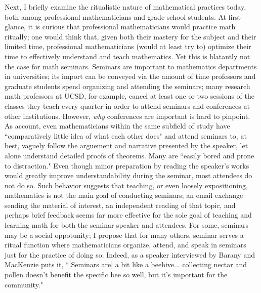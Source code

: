 \documentclass[12pt, letterpaper]{article}
\begin{document}
\vspace{1.5em} 
Next, I briefly examine the ritualistic nature of mathematical practices today, both among professional mathematicians and grade school students. 
At first glance, it is curious that professional mathematicians would practice math ritually; 
one would think that, given both their mastery for the subject and their limited time, professional mathematicians (would at least try to) optimize their time to effectively understand and teach mathematics. 
Yet this is blatantly not the case for math seminars. 
Seminars are important to mathematics departments in universities; 
its import can be conveyed via the amount of time professors and graduate students spend organizing and attending the seminars;
many research math professors at UCSD, for example, cancel at least one or two sessions of the classes they teach every quarter in order to attend seminars and conferences at other institutions. 
However, \textit{why} conferences are important is hard to pinpoint. 
As \cite{barany2014chalk} account, even mathematicians within the same subfield of study have ``comparatively little idea of what each other does" and attend seminars to, at best, vaguely follow the arguement and narrative presented by the speaker, let alone understand detailed proofs of theorems. 
Many are ``easily bored and prone to distraction."
Even though minor preparation by reading the speaker's works would greatly improve understandability during the seminar, most attendees do not do so. 
Such behavior suggests that teaching, or even loosely expositioning, mathematics is not the main goal of conducting seminars; 
an email exchange sending the material of interest, an independent reading of that topic, and perhaps brief feedback seems far more effective for the sole goal of teaching and learning math for both the seminar speaker and attendees. 
For some, seminars may be a social oppotunity; 
I propose that for many others, seminar serves a ritual function where mathematicians organize, attend, and speak in seminars just for the practice of doing so. 
Indeed, as a speaker interviewed by Barany and MacKenzie puts it, 
``[Seminars are] a bit like a beehive... collecting nectar and pollen doesn't benefit the specific bee so well, but it's important for the community."  
\end{document}
